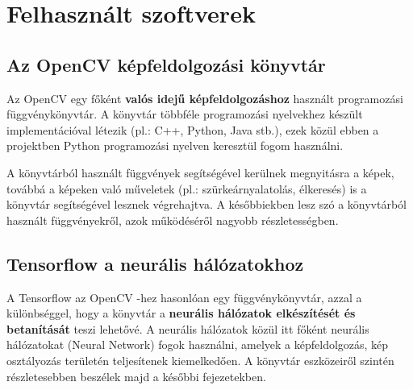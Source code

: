 \chapter{Felhasznált szoftverek}

\section{Az OpenCV képfeldolgozási könyvtár}
Az OpenCV egy főként \textbf{valós idejű képfeldolgozáshoz} használt programozási függvénykönyvtár. A könyvtár többféle programozási nyelvekhez készült implementációval létezik (pl.: C++, Python, Java stb.)\cite{opencv_library}, ezek közül ebben a projektben Python programozási nyelven keresztül fogom használni.
\par A könyvtárból használt függvények segítségével kerülnek megnyitásra a képek, továbbá a képeken való műveletek (pl.: szürkeárnyalatolás, élkeresés) is a könyvtár segítségével lesznek végrehajtva. A későbbiekben lesz szó a könyvtárból használt függvényekről, azok működéséről nagyobb részletességben.

\section{Tensorflow a neurális hálózatokhoz}
A Tensorflow az OpenCV -hez hasonlóan egy függvénykönyvtár, azzal a különbséggel, hogy a könyvtár a \textbf{neurális hálózatok elkészítését és betanítását} teszi lehetővé.\cite{tensorflow2015-whitepaper} A neurális hálózatok közül itt főként neurális hálózatokat (Neural Network) fogok használni, amelyek a képfeldolgozás, kép osztályozás területén teljesítenek kiemelkedően. A könyvtár eszközeiről szintén részletesebben beszélek majd a későbbi fejezetekben.